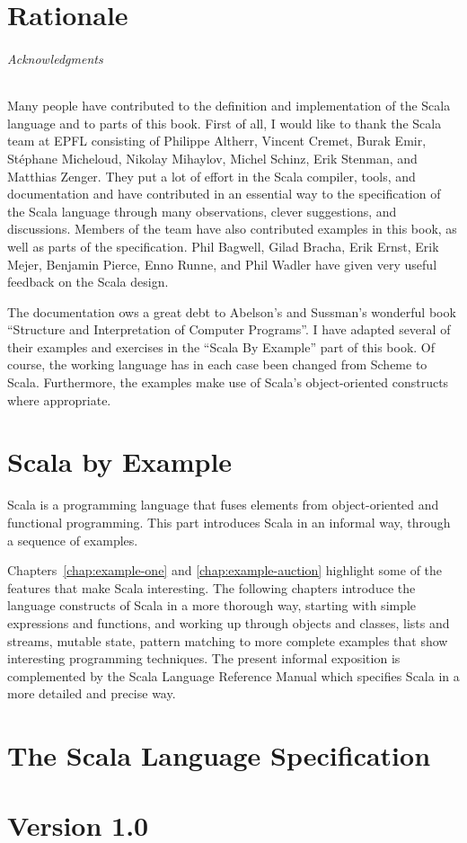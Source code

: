 \documentclass[a4paper,12pt,twoside,titlepage]{book}
\begin{document}
\frontmatter
\makedoctitle
\clearemptydoublepage
\tableofcontents
\mainmatter
\sloppy

\part{Rationale}



\paragraph{Acknowledgments}
Many people have contributed to the definition and implementation of
the Scala language and to parts of this book. First of all, I would
like to thank the Scala team at EPFL consisting of Philippe Altherr,
Vincent Cremet, Burak Emir, St\'ephane Micheloud, Nikolay Mihaylov,
Michel Schinz, Erik Stenman, and Matthias Zenger. They put a lot of
effort in the Scala compiler, tools, and documentation and have
contributed in an essential way to the specification of the Scala
language through many observations, clever suggestions, and
discussions. Members of the team have also contributed examples in
this book, as well as parts of the specification. Phil Bagwell, Gilad
Bracha, Erik Ernst, Erik Mejer, Benjamin Pierce, Enno Runne, and Phil
Wadler have given very useful feedback on the Scala design. 

The documentation ows a great debt to Abelson's and Sussman's
wonderful book ``Structure and Interpretation of Computer
Programs''\cite{abelson-sussman:structure}. I have adapted several of
their examples and exercises in the ``Scala By Example'' part of this
book. Of course, the working language has in each case been changed
from Scheme to Scala. Furthermore, the examples make use of Scala's
object-oriented constructs where appropriate.

\part{Scala by Example}

Scala is a programming language that fuses elements from
object-oriented and functional programming. This part introduces Scala
in an informal way, through a sequence of examples.

Chapters~\ref{chap:example-one} and \ref{chap:example-auction}
highlight some of the features that make Scala interesting. The
following chapters introduce the language constructs of Scala in a
more thorough way, starting with simple expressions and functions, and
working up through objects and classes, lists and streams, mutable
state, pattern matching to more complete examples that show
interesting programming techniques. The present informal exposition is
complemented by the Scala Language Reference Manual which specifies
Scala in a more detailed and precise way.



\part{The Scala Language Specification \\ \ \\ \Large Version 1.0}







\end{document}
